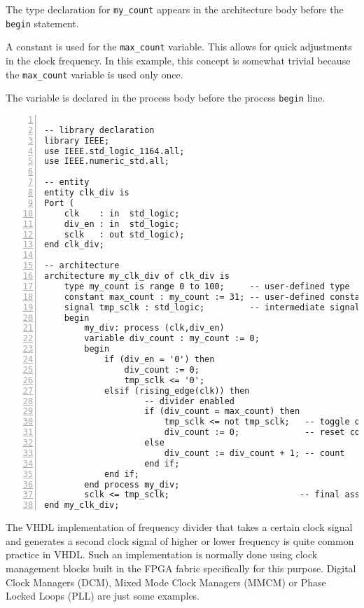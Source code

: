 \begin{my_list}
\item The type declaration for  \texttt{my\_count} appears in the architecture body before the \texttt{begin} statement.

\item A constant is used for the  \texttt{max\_count} variable. This allows for quick adjustments in the clock frequency. In this example, this concept is somewhat trivial because the  \texttt{max\_count} variable is used only once.

\item The variable is declared in the process body before the process \texttt{begin} line.
\end{my_list}

\noindent
\begin{minipage}{0.99\linewidth}
\begin{lstlisting}[numbers=left,label=ex26_code, caption=Solution to Example~26.]

-- library declaration
library IEEE;
use IEEE.std_logic_1164.all;
use IEEE.numeric_std.all;

-- entity
entity clk_div is
Port (
    clk    : in  std_logic;
    div_en : in  std_logic;
    sclk   : out std_logic);
end clk_div;

-- architecture
architecture my_clk_div of clk_div is
    type my_count is range 0 to 100;     -- user-defined type
    constant max_count : my_count := 31; -- user-defined constant
    signal tmp_sclk : std_logic;         -- intermediate signal
    begin
        my_div: process (clk,div_en)
        variable div_count : my_count := 0;
        begin
            if (div_en = '0') then
                div_count := 0;
                tmp_sclk <= '0';
            elsif (rising_edge(clk)) then
                    -- divider enabled
                    if (div_count = max_count) then
                        tmp_sclk <= not tmp_sclk;   -- toggle output
                        div_count := 0;             -- reset count
                    else
                        div_count := div_count + 1; -- count
                    end if;
            end if;
        end process my_div;
        sclk <= tmp_sclk;                          -- final assignment
end my_clk_div;
\end{lstlisting}
\end{minipage}

The VHDL implementation of frequency divider that takes a certain clock signal and generates a second clock signal of higher or lower frequency is quite common practice in VHDL. Such an implementation is normally done using clock management blocks built in the FPGA fabric specifically for this purpose. Digital Clock Managers (DCM), Mixed Mode Clock Managers (MMCM) or Phase Locked Loops (PLL) are just some examples.

